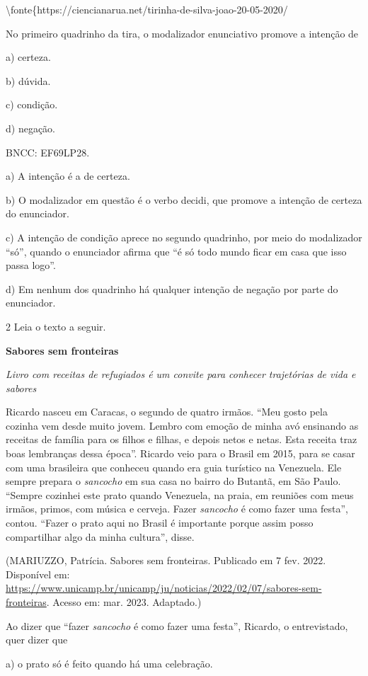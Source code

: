 \textbackslash fonte\{https://ciencianarua.net/tirinha-de-silva-joao-20-05-2020/

No primeiro quadrinho da tira, o modalizador enunciativo promove a
intenção de

a) certeza.

b) dúvida.

c) condição.

d) negação.

BNCC: EF69LP28.

a) A intenção é a de certeza.

b) O modalizador em questão é o verbo decidi, que promove a intenção de
certeza do enunciador.

c) A intenção de condição aprece no segundo quadrinho, por meio do
modalizador ``só'', quando o enunciador afirma que ``é só todo mundo
ficar em casa que isso passa logo''.

d) Em nenhum dos quadrinho há qualquer intenção de negação por parte do
enunciador.

\num{2} Leia o texto a seguir.

\textbf{Sabores sem fronteiras}

\emph{Livro com receitas de refugiados é um convite para conhecer
trajetórias de vida e sabores}

Ricardo nasceu em Caracas, o segundo de quatro irmãos. ``Meu gosto pela
cozinha vem desde muito jovem. Lembro com emoção de minha avó ensinando
as receitas de família para os filhos e filhas, e depois netos e netas.
Esta receita traz boas lembranças dessa época''. Ricardo veio para o
Brasil em 2015, para se casar com uma brasileira que conheceu quando era
guia turístico na Venezuela. Ele sempre prepara o \emph{sancocho} em sua
casa no bairro do Butantã, em São Paulo. ``Sempre cozinhei este prato
quando Venezuela, na praia, em reuniões com meus irmãos, primos, com
música e cerveja. Fazer \emph{sancocho} é como fazer uma festa'',
contou. ``Fazer o prato aqui no Brasil é importante porque assim posso
compartilhar algo da minha cultura'', disse.

(MARIUZZO, Patrícia. Sabores sem fronteiras. Publicado em 7 fev. 2022.
Disponível em:
\url{https://www.unicamp.br/unicamp/ju/noticias/2022/02/07/sabores-sem-fronteiras}.
Acesso em: mar. 2023. Adaptado.)

Ao dizer que ``fazer \emph{sancocho} é como fazer uma festa'', Ricardo,
o entrevistado, quer dizer que

a) o prato só é feito quando há uma celebração.

